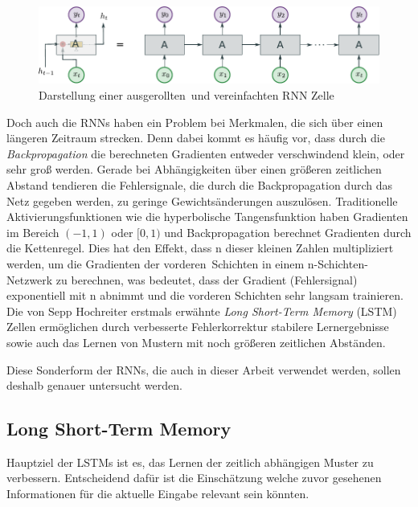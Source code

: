                 \begin{figure}[ht]
                    \centering
                    \includegraphics[width=1\textwidth]{images/Illustrationen/RNN_enrolled}
                    \caption{Darstellung einer \glqq ausgerollten\grqq \ und vereinfachten RNN Zelle}
                    \label{fig:RNN_enroled}
                \end{figure}
            Doch auch die RNNs haben ein Problem bei Merkmalen, die sich über einen längeren Zeitraum strecken.
            Denn dabei kommt es häufig vor, dass durch die \textit{Backpropagation} die berechneten Gradienten entweder verschwindend klein, oder sehr groß werden.
            Gerade bei Abhängigkeiten über einen größeren zeitlichen Abstand tendieren die Fehlersignale,
            die durch die Backpropagation durch das Netz gegeben werden, zu geringe Gewichtsänderungen auszulösen.
            Traditionelle Aktivierungsfunktionen wie die hyperbolische Tangensfunktion haben Gradienten im Bereich $(-1,1)$ oder $[0,1)$ und Backpropagation berechnet Gradienten durch die Kettenregel.
            Dies hat den Effekt, dass n dieser kleinen Zahlen multipliziert werden, um die Gradienten der \glqq vorderen\grqq \ Schichten in einem n-Schichten-Netzwerk zu berechnen, was bedeutet, dass der Gradient (Fehlersignal) exponentiell mit n abnimmt und die vorderen Schichten sehr langsam trainieren.
            Die von Sepp Hochreiter erstmals erwähnte \textit{Long Short-Term Memory} (LSTM) Zellen ermöglichen durch verbesserte Fehlerkorrektur stabilere Lernergebnisse sowie auch das Lernen von Mustern mit noch größeren zeitlichen Abständen.~\cite{HOCHREITER1998}

            Diese Sonderform der RNNs, die auch in dieser Arbeit verwendet werden, sollen deshalb genauer untersucht werden.
   	
        \subsection{Long Short-Term Memory} 
            Hauptziel der \acp{LSTM} ist es, das Lernen der zeitlich abhängigen Muster zu verbessern.
            Entscheidend dafür ist die Einschätzung welche zuvor gesehenen Informationen für die aktuelle Eingabe relevant sein könnten.
            

